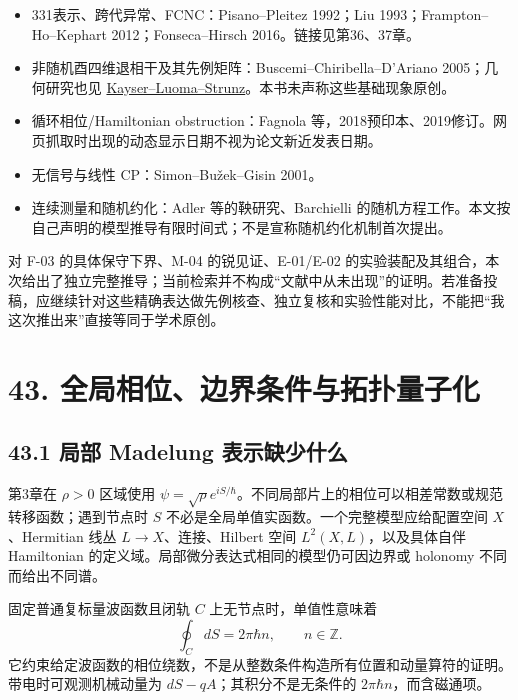 \documentclass[
  11pt,
  oneside]{book}
\providecommand{\tightlist}{%
  \setlength{\itemsep}{0pt}\setlength{\parskip}{0pt}}
\begin{document}
\begin{itemize}
\tightlist
\item
  331表示、跨代异常、FCNC：Pisano--Pleitez 1992；Liu
  1993；Frampton--Ho--Kephart 2012；Fonseca--Hirsch
  2016。链接见第36、37章。
\item
  非随机酉四维退相干及其先例矩阵：Buscemi--Chiribella--D'Ariano
  2005；几何研究也见
  \href{https://arxiv.org/abs/1508.04027}{Kayser--Luoma--Strunz}。本书未声称这些基础现象原创。
\item
  循环相位/Hamiltonian obstruction：Fagnola
  等，2018预印本、2019修订。网页抓取时出现的动态显示日期不视为论文新近发表日期。
\item
  无信号与线性 CP：Simon--Bužek--Gisin 2001。
\item
  连续测量和随机约化：Adler 等的鞅研究、Barchielli
  的随机方程工作。本文按自己声明的模型推导有限时间式；不是宣称随机约化机制首次提出。
\end{itemize}

对 F-03 的具体保守下界、M-04 的锐见证、E-01/E-02
的实验装配及其组合，本次给出了独立完整推导；当前检索并不构成``文献中从未出现''的证明。若准备投稿，应继续针对这些精确表达做先例核查、独立复核和实验性能对比，不能把``我这次推出来''直接等同于学术原创。

\hypertarget{ch-43}{%
\chapter{43. 全局相位、边界条件与拓扑量子化}\label{ch-43}}

\hypertarget{ux5c40ux90e8-madelung-ux8868ux793aux7f3aux5c11ux4ec0ux4e48}{%
\section{43.1 局部 Madelung
表示缺少什么}\label{ux5c40ux90e8-madelung-ux8868ux793aux7f3aux5c11ux4ec0ux4e48}}

第3章在 \(\rho>0\) 区域使用
\(\psi=\sqrt\rho e^{iS/\hbar}\)。不同局部片上的相位可以相差常数或规范转移函数；遇到节点时
\(S\) 不必是全局单值实函数。一个完整模型应给配置空间 \(X\)、Hermitian
线丛 \(L\to X\)、连接、Hilbert 空间 \(L^2(X,L)\)，以及具体自伴
Hamiltonian 的定义域。局部微分表达式相同的模型仍可因边界或 holonomy
不同而给出不同谱。

固定普通复标量波函数且闭轨 \(C\) 上无节点时，单值性意味着 \[
\oint_C dS=2\pi\hbar n,\qquad n\in\mathbb Z.
\]
它约束给定波函数的相位绕数，不是从整数条件构造所有位置和动量算符的证明。带电时可观测机械动量为
\(dS-qA\)；其积分不是无条件的 \(2\pi\hbar n\)，而含磁通项。
\end{document}
